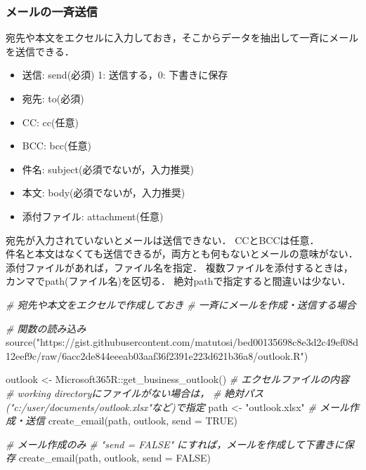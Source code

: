 \documentclass[
]{article}
\newenvironment{Shaded}{\begin{snugshade}}{\end{snugshade}}
\newcommand{\AttributeTok}[1]{\textcolor[rgb]{0.77,0.63,0.00}{#1}}
\newcommand{\CommentTok}[1]{\textcolor[rgb]{0.56,0.35,0.01}{\textit{#1}}}
\newcommand{\ConstantTok}[1]{\textcolor[rgb]{0.00,0.00,0.00}{#1}}
\newcommand{\FunctionTok}[1]{\textcolor[rgb]{0.00,0.00,0.00}{#1}}
\newcommand{\NormalTok}[1]{#1}
\newcommand{\OtherTok}[1]{\textcolor[rgb]{0.56,0.35,0.01}{#1}}
\newcommand{\SpecialCharTok}[1]{\textcolor[rgb]{0.00,0.00,0.00}{#1}}
\newcommand{\StringTok}[1]{\textcolor[rgb]{0.31,0.60,0.02}{#1}}
\providecommand{\tightlist}{%
  \setlength{\itemsep}{0pt}\setlength{\parskip}{0pt}}
\begin{document}
\hypertarget{ux30e1ux30fcux30ebux306eux4e00ux6589ux9001ux4fe1}{%
\subsubsection{メールの一斉送信}\label{ux30e1ux30fcux30ebux306eux4e00ux6589ux9001ux4fe1}}

宛先や本文をエクセルに入力しておき，そこからデータを抽出して一斉にメールを送信できる．

\begin{itemize}
\tightlist
\item
  送信: send(必須) 1: 送信する，0: 下書きに保存
\item
  宛先: to(必須)\\
\item
  CC: cc(任意)\\
\item
  BCC: bcc(任意)\\
\item
  件名: subject(必須でないが，入力推奨)\\
\item
  本文: body(必須でないが，入力推奨)\\
\item
  添付ファイル: attachment(任意)
\end{itemize}

宛先が入力されていないとメールは送信できない．
CCとBCCは任意．\\
件名と本文はなくても送信できるが，両方とも何もないとメールの意味がない．\\
添付ファイルがあれば，ファイル名を指定．
複数ファイルを添付するときは，カンマでpath(ファイル名)を区切る．
絶対pathで指定すると間違いは少ない．

\begin{Shaded}
\begin{Highlighting}[]
  \CommentTok{\# 宛先や本文をエクセルで作成しておき}
  \CommentTok{\#   一斉にメールを作成・送信する場合}

  \CommentTok{\# 関数の読み込み}
\FunctionTok{source}\NormalTok{(}\StringTok{"https://gist.githubusercontent.com/matutosi/bed00135698c8e3d2c49ef08d12eef9c/raw/6acc2de844eeeab03aaf36f2391e223d621b36a8/outlook.R"}\NormalTok{)}

\NormalTok{outlook }\OtherTok{\textless{}{-}}\NormalTok{ Microsoft365R}\SpecialCharTok{::}\FunctionTok{get\_business\_outlook}\NormalTok{()}
  \CommentTok{\# エクセルファイルの内容}
  \CommentTok{\#   working directoryにファイルがない場合は，}
  \CommentTok{\#   絶対パス("c:/user/documents/outlook.xlsx"など)で指定}
\NormalTok{path }\OtherTok{\textless{}{-}} \StringTok{"outlook.xlsx"}
  \CommentTok{\# メール作成・送信}
\FunctionTok{create\_email}\NormalTok{(path, outlook, }\AttributeTok{send =} \ConstantTok{TRUE}\NormalTok{)}

  \CommentTok{\# メール作成のみ}
  \CommentTok{\#   "send = FALSE" にすれば，メールを作成して下書きに保存}
\FunctionTok{create\_email}\NormalTok{(path, outlook, }\AttributeTok{send =} \ConstantTok{FALSE}\NormalTok{)}
\end{Highlighting}
\end{Shaded}
\end{document}
